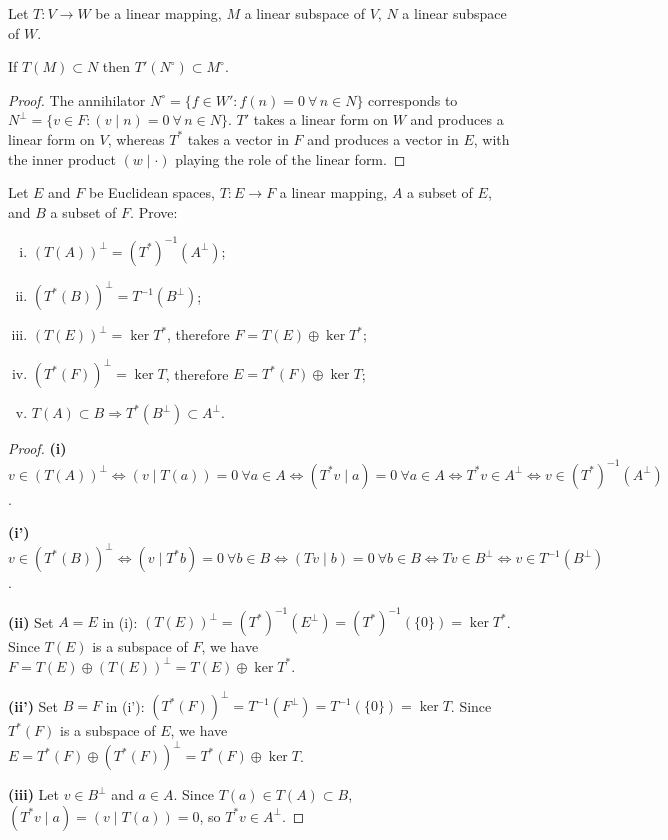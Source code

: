 \begin{theorem}[Exercise 18]
    Let $T : V \longrightarrow W$ be a linear mapping, $M$ a linear subspace 
    of $V$, $N$ a linear subspace of $W$. 

    If $T(M) \subset N$ then $T'(N^\circ) \subset M^\circ$.
\end{theorem}

\begin{proof}
    The annihilator 
    $N^\circ = \{ f \in W' : f(n) = 0 \ \forall\, n \in N \}$ corresponds to 
    $N^\perp = \{ v \in F : (v \mid n) = 0 \ \forall\, n \in N \}$.
    $T'$ takes a linear form on $W$ and produces a linear form on $V$,
    whereas $T^*$ takes a vector in $F$ and produces a vector in $E$,
    with the inner product $(w \mid \cdot)$ playing the role of the linear form.
\end{proof}


\begin{tcolorbox}[title=Problem 7, breakable]
Let $E$ and $F$ be Euclidean spaces, $T:E \to F$ a linear mapping, $A$ a subset of $E$, and $B$ a subset of $F$. Prove:
\begin{enumerate}[(i)]
    \item $(T(A))^\perp = (T^*)^{-1}(A^\perp)$;
    \item[(i')] $(T^*(B))^\perp = T^{-1}(B^\perp)$;
    \item[(ii)] $(T(E))^\perp = \ker T^*$, therefore $F = T(E) \oplus \ker T^*$;
    \item[(ii')] $(T^*(F))^\perp = \ker T$, therefore $E = T^*(F) \oplus \ker T$;
    \item[(iii)] $T(A) \subset B \Rightarrow T^*(B^\perp) \subset A^\perp$.
\end{enumerate}
\end{tcolorbox}

\begin{proof}
\textbf{(i)} $v \in (T(A))^\perp \iff (v \mid T(a)) = 0\ \forall a \in A 
\iff (T^*v \mid a) = 0\ \forall a \in A \iff T^*v \in A^\perp 
\iff v \in (T^*)^{-1}(A^\perp)$.

\textbf{(i')} $v \in (T^*(B))^\perp \iff (v \mid T^*b) = 0\ \forall b \in B
\iff (Tv \mid b) = 0\ \forall b \in B \iff Tv \in B^\perp
\iff v \in T^{-1}(B^\perp)$.

\textbf{(ii)} Set $A = E$ in (i): $(T(E))^\perp = (T^*)^{-1}(E^\perp) = (T^*)^{-1}(\{0\}) = \ker T^*$.
Since $T(E)$ is a subspace of $F$, we have $F = T(E) \oplus (T(E))^\perp = T(E) \oplus \ker T^*$.

\textbf{(ii')} Set $B = F$ in (i'): $(T^*(F))^\perp = T^{-1}(F^\perp) = T^{-1}(\{0\}) = \ker T$.
Since $T^*(F)$ is a subspace of $E$, we have $E = T^*(F) \oplus (T^*(F))^\perp = T^*(F) \oplus \ker T$.

\textbf{(iii)} Let $v \in B^\perp$ and $a \in A$. Since $T(a) \in T(A) \subset B$,
$(T^*v \mid a) = (v \mid T(a)) = 0$, so $T^*v \in A^\perp$.
\end{proof}

